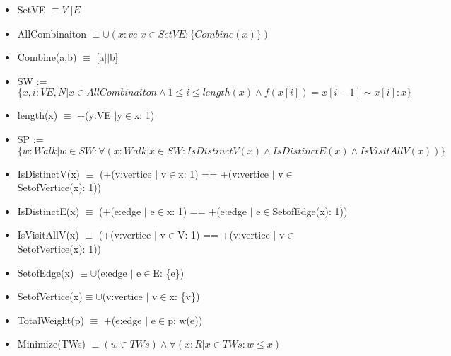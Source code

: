 \documentclass[12pt]{article}
\begin{document}
\begin{itemize}
    \item SetVE $\equiv V || E$
    \item AllCombinaiton $\equiv \cup(x: ve | x\in SetVE: \{Combine(x)\})$
    \item Combine(a,b) $\equiv$ [a$||$b]
    \item SW := 
    $$\{x, i: VE, N| x \in AllCombinaiton \wedge 1 \le i \le length(x) \wedge f(x[i]) = x[i-1]\sim x[i] : x\}$$
    \item length(x) $\equiv$ +(y:VE $|$y$\in$x: 1)
    \item SP :=
    $$\{w:Walk | w\in SW: \forall (x: Walk | x \in SW: IsDistinctV(x) \wedge IsDistinctE(x) \wedge IsVisitAllV(x))\}$$
    \item IsDistinctV(x) $\equiv$ (+(v:vertice $|$ v$\in$x: 1) == +(v:vertice $|$ v$\in$SetofVertice(x): 1))
    \item IsDistinctE(x) $\equiv$ (+(e:edge $|$ e$\in$x: 1) == +(e:edge $|$ e$\in$SetofEdge(x): 1))
    \item IsVisitAllV(x) $\equiv$ (+(v:vertice $|$ v$\in$V: 1) == +(v:vertice $|$ v$\in$SetofVertice(x): 1))
    \item SetofEdge(x) $\equiv \cup$(e:edge $|$ e$\in$E: \{e\})
    \item SetofVertice(x)$\equiv \cup$(v:vertice $|$ v$\in$x: \{v\})
    \item TotalWeight(p) $\equiv$ +(e:edge $|$ e$\in$p: w(e))
    \item Minimize(TWs) $\equiv (w \in TWs) \wedge \forall (x :R | x \in TWs : w \le x)$
\end{itemize}
\end{document}
